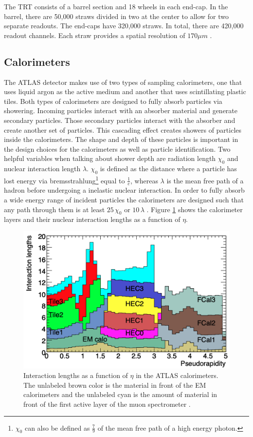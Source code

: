 			The \gls{TRT} consists of a barrel section and 18 wheels in each end-cap. In the barrel, there are 50,000 straws divided in two at the center to allow for two separate readouts. The end-caps have 320,000 straws. In total, there are 420,000 readout channels. Each straw provides a spatial resolution of $170 \mu m$ \cite{ATLAS-ID}.

	\subsection{Calorimeters}\label{ssec:calorimeters}
		The ATLAS detector makes use of two types of sampling calorimeters, one that uses liquid argon as the active medium and another that uses scintillating plastic tiles. Both types of calorimeters are designed to fully absorb particles via showering. Incoming particles interact with an absorber material and generate secondary particles. Those secondary particles interact with the absorber and create another set of particles. This cascading effect creates showers of particles inside the calorimeters. The shape and depth of these particles is important in the design choices for the calorimeters as well as particle identification. Two helpful variables when talking about shower depth are radiation length $\chi_0$ and nuclear interaction length $\lambda$. $\chi_0$ is defined as the distance where a particle has lost energy via bremsstrahlung\footnote{$\chi_0$ can also be defined as $\frac{7}{9}$ of the mean free path of a high energy photon.} equal to $\frac{1}{e}$, whereas $\lambda$ is the mean free path of a hadron before undergoing a inelastic nuclear interaction. In order to fully absorb a wide energy range of incident particles the calorimeters are designed such that any path through them is at least $25 \, \chi_0$ or $10 \, \lambda$ \cites{LAr-TDR}{ATLAS-tile}. Figure \ref{fig:calo-interaction-length} shows the calorimeter layers and their nuclear interaction lengths as a function of $\eta$.

		\begin{figure}[!ht]
		\centering
		\includegraphics[width=.65\textwidth,keepaspectratio=true]{chapters/chapter3_experiment/images/Calo_Interaction_Lengths.png}
		\caption{ Interaction lengths as a function of $\eta$ in the \gls{ATLAS} calorimeters. The unlabeled brown color is the material in front of the EM calorimeters and the unlabeled cyan is the amount of material in front of the first active layer of the muon spectrometer \cite{atlas-experiment}.}
		\label{fig:calo-interaction-length}
		\end{figure}


